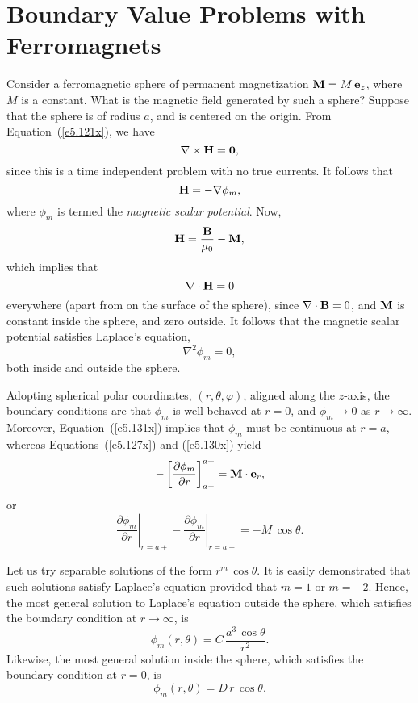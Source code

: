 \section{Boundary Value Problems with Ferromagnets}
Consider a ferromagnetic sphere of permanent magnetization ${\bf M} = M\,{\bf e}_z$, where $M$ is a constant. What is the magnetic field generated by such a sphere? Suppose
that the sphere is of radius $a$, and is centered on the origin. From Equation~(\ref{e5.121x}), we
have 
\begin{equation}
\nabla\times {\bf H} = {\bf 0},
\end{equation}
since this is a time independent problem with no true currents. It follows that
\begin{equation}
{\bf H} = - \nabla\phi_m,
\end{equation}
where $\phi_m$ is termed the {\em magnetic scalar potential}. Now,
\begin{equation}
{\bf H} = \frac{\bf B}{\mu_0} - {\bf M},
\end{equation}
which implies that
\begin{equation}
\nabla\cdot {\bf H} = 0
\end{equation}
everywhere (apart from on the surface of the sphere), since $\nabla\cdot{\bf B} = 0$, and ${\bf M}$ is constant inside the sphere, and zero outside.
It follows that the magnetic scalar potential satisfies Laplace's equation,
\begin{equation}
\nabla^2\phi_m=0,
\end{equation}
both inside and outside the sphere.

Adopting spherical polar coordinates,
$(r, \theta, \varphi)$, aligned along the $z$-axis, the boundary conditions are that $\phi_m$ is well-behaved at $r=0$, and
$\phi_m\rightarrow 0$ as $r\rightarrow\infty$. Moreover, Equation~(\ref{e5.131x})
implies that $\phi_m$ must be continuous at $r=a$, whereas Equations~(\ref{e5.127x}) and (\ref{e5.130x}) yield
\begin{equation}
-\left[\frac{\partial \phi_m}{\partial r}\right]_{a-}^{a+} = {\bf M}\cdot{\bf e}_r,
\end{equation}
or
\begin{equation}\label{e5.139}
\left.\frac{\partial\phi_m}{\partial r}\right|_{r=a+}  - \left.\frac{\partial\phi_m}{\partial r}\right|_{r=a-} = -M\,\cos\theta.
\end{equation}

Let us try separable solutions of the form $r^m\,\cos\theta$. It is
easily demonstrated that such solutions satisfy Laplace's equation
provided that $m=1$ or $m=-2$. Hence, the most general solution to Laplace's equation outside
the sphere, which satisfies the boundary condition at $r\rightarrow\infty$, is
\begin{equation}
\phi_m(r,\theta) = C\,\frac{a^3\,\cos\theta}{r^2}.
\end{equation}
Likewise, the most general solution inside the sphere, which satisfies
the boundary condition at $r=0$, is
\begin{equation}
\phi_m(r,\theta) = D\,r\,\cos\theta.
\end{equation}

